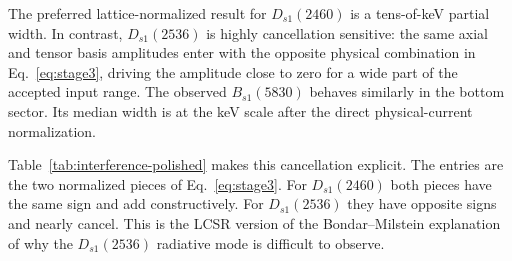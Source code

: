 \documentclass[11pt]{article}
\newcommand{\Dsone}{D_{s1}}
\newcommand{\Bsone}{B_{s1}}
\newcommand{\GeV}{\mathrm{GeV}}
\begin{document}
The preferred lattice-normalized result for $\Dsone(2460)$ is a tens-of-keV
partial width.  In contrast, $\Dsone(2536)$ is highly cancellation sensitive:
the same axial and tensor basis amplitudes enter with the opposite physical
combination in Eq.~\eqref{eq:stage3}, driving the amplitude close to zero for a
wide part of the accepted input range.  The observed $\Bsone(5830)$ behaves
similarly in the bottom sector.  Its median width is at the keV scale after the
direct physical-current normalization.

Table~\ref{tab:interference-polished} makes this cancellation explicit.  The
entries are the two normalized pieces of Eq.~\eqref{eq:stage3}.  For
$\Dsone(2460)$ both pieces have the same sign and add constructively.  For
$\Dsone(2536)$ they have opposite signs and nearly cancel.  This is the LCSR
version of the Bondar--Milstein explanation of why the $\Dsone(2536)$ radiative
mode is difficult to observe.

\begin{table}[htbp]
  \centering
  \caption{Central lattice-photon benchmark at the midpoint of the selected
  transition window.  The $2460$ pieces remain constructive and the $2536$
  pieces remain destructive; the angle changes the distance from the
  cancellation near $23.96^\circ$.  All $G$ values are in $\GeV^{-1}$.}
  \label{tab:interference-polished}
\end{table}
\end{document}
